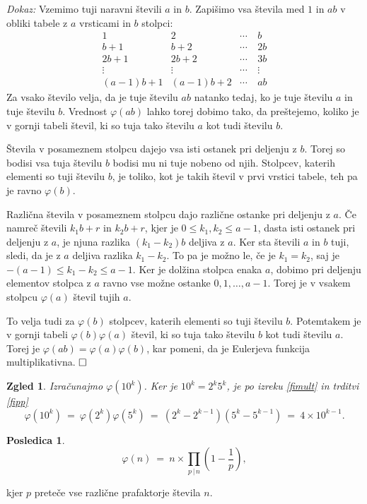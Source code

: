 \documentclass[a4paper,12pt]{article}
\def\qed{$\hfill\Box$}   %
\newtheorem{posledica}{Posledica}
\newtheorem{zgled}{Zgled}
\begin{document}
\noindent
{\em Dokaz:\/} Vzemimo tuji naravni števili $a$ in $b$. Zapišimo vsa števila med $1$ in $ab$
v obliki tabele z $a$ vrsticami in $b$ stolpci:
\[
\begin{array}{cccc}
1 & 2 & \cdots & \ b \\
b+1 & b+2 & \cdots & \ 2b \\
2b+1 & 2b+2 & \cdots & \ 3b \\
\vdots & \vdots & \cdots & \ \vdots \\
(a-1)b+1 & (a-1)b+2 & \cdots & \ ab 
\end{array}
\]
Za vsako število velja, da je tuje številu $ab$ natanko tedaj, ko je tuje številu $a$ in tuje številu $b$.
Vrednost $\varphi(ab)$ lahko torej dobimo tako, da preštejemo, koliko je v gornji tabeli števil, ki so tuja
tako številu $a$ kot tudi številu $b$. 

Števila v posameznem stolpcu dajejo vsa isti ostanek pri deljenju z $b$. Torej so bodisi vsa tuja številu
$b$ bodisi mu ni tuje nobeno od njih. Stolpcev, katerih elementi so tuji številu $b$, je toliko, kot je
takih števil v prvi vrstici tabele, teh pa je ravno $\varphi(b)$.

Različna števila v posameznem stolpcu dajo različne ostanke pri deljenju z $a$. Če namreč števili
$k_1 b + r$ in $k_2 b + r$, kjer je $0 \le k_1, k_2 \le a-1$, dasta isti ostanek pri deljenju z $a$, je njuna razlika $(k_1 - k_2) b$
deljiva z $a$. Ker sta števili $a$ in $b$ tuji, sledi, da je z $a$ deljiva razlika $k_1 - k_2$.
To pa je možno le, če je $k_1 = k_2$, saj je $-(a-1) \le k_1 - k_2 \le a-1$. Ker je dolžina stolpca
enaka $a$, dobimo pri deljenju elementov stolpca z $a$ ravno vse možne ostanke $0, 1,\ldots, a-1$.
Torej je v vsakem stolpcu $\varphi(a)$ števil tujih $a$. 

To velja tudi za $\varphi(b)$ stolpcev, katerih elementi so tuji številu $b$. Potemtakem je v gornji tabeli
$\varphi(b)\varphi(a)$ števil, ki so tuja tako številu $b$ kot tudi številu $a$. 
Torej je $\varphi(ab) = \varphi(a)\varphi(b)$, kar pomeni, da je Eulerjeva funkcija multiplikativna. \qed


\begin{zgled}
Izračunajmo $\varphi(10^k)$. Ker je $10^k = 2^k 5^k$, je po izreku \ref{fimult} in trditvi \ref{fipp}
\[
\varphi(10^k)\ =\ \varphi(2^k)\varphi(5^k)\ =\ (2^k - 2^{k-1})(5^k - 5^{k-1})\ =\ 4\times 10^{k-1}.
\]
\end{zgled}


\begin{posledica}
\[
\varphi(n)\ =\ n \times \prod_{p\,|\,n} \left(1 - \frac{1}{p}\right),
\]
\end{posledica}
kjer $p$ preteče vse različne prafaktorje števila $n$.
\end{document}
